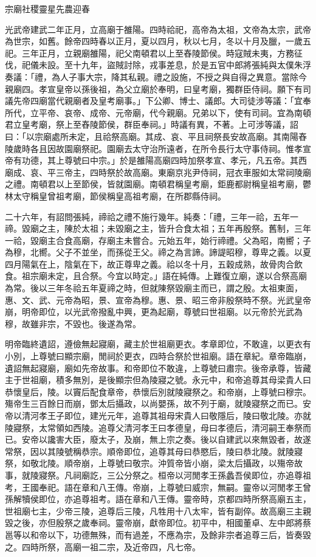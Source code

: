 
\begin{pinyinscope}
宗廟社稷靈星先農迎春

光武帝建武二年正月，立高廟于雒陽。四時祫祀，高帝為太祖，文帝為太宗，武帝為世宗，如舊。餘帝四時春以正月，夏以四月，秋以七月，冬以十月及臘，一歲五祀。三年正月，立親廟雒陽，祀父南頓君以上至舂陵節侯。時寇賊未夷，方務征伐，祀儀未設。至十九年，盜賊討除，戎事差息，於是五官中郎將張純與太僕朱浮奏議：「禮，為人子事大宗，降其私親。禮之設施，不授之與自得之異意。當除今親廟四。孝宣皇帝以孫後祖，為父立廟於奉明，曰皇考廟，獨群臣侍祠。願下有司議先帝四廟當代親廟者及皇考廟事。」下公卿、博士、議郎。大司徒涉等議：「宜奉所代，立平帝、哀帝、成帝、元帝廟，代今親廟。兄弟以下，使有司祠。宜為南頓君立皇考廟，祭上至舂陵節侯，群臣奉祠。」時議有異，不著。上可涉等議，詔曰：「以宗廟處所未定，且祫祭高廟。其成、哀、平且祠祭長安故高廟。其南陽舂陵歲時各且因故園廟祭祀。園廟去太守治所遠者，在所令長行太守事侍祠。惟孝宣帝有功德，其上尊號曰中宗。」於是雒陽高廟四時加祭孝宣、孝元，凡五帝。其西廟成、哀、平三帝主，四時祭於故高廟。東廟京兆尹侍祠，冠衣車服如太常祠陵廟之禮。南頓君以上至節侯，皆就園廟。南頓君稱皇考廟，鉅鹿都尉稱皇祖考廟，鬱林太守稱皇曾祖考廟，節侯稱皇高祖考廟，在所郡縣侍祠。

二十六年，有詔問張純，禘祫之禮不施行幾年。純奏：「禮，三年一祫，五年一禘。毀廟之主，陳於太祖；未毀廟之主，皆升合食太祖；五年再殷祭。舊制，三年一祫，毀廟主合食高廟，存廟主未嘗合。元始五年，始行禘禮。父為昭，南嚮；子為穆，北嚮。父子不並坐，而孫從王父。禘之為言諦。諦諟昭穆，尊卑之義。以夏四月陽氣在上，陰氣在下，故正尊卑之義。祫以冬十月，五穀成熟，故骨肉合飲食。祖宗廟未定，且合祭。今宜以時定。」語在純傳。上難復立廟，遂以合祭高廟為常。後以三年冬祫五年夏禘之時，但就陳祭毀廟主而已，謂之殷。太祖東面，惠、文、武、元帝為昭，景、宣帝為穆。惠、景、昭三帝非殷祭時不祭。光武皇帝崩，明帝即位，以光武帝撥亂中興，更為起廟，尊號曰世祖廟。以元帝於光武為穆，故雖非宗，不毀也。後遂為常。

明帝臨終遺詔，遵儉無起寢廟，藏主於世祖廟更衣。孝章即位，不敢違，以更衣有小別，上尊號曰顯宗廟，閒祠於更衣，四時合祭於世祖廟。語在章紀。章帝臨崩，遺詔無起寢廟，廟如先帝故事。和帝即位不敢違，上尊號曰肅宗。後帝承尊，皆藏主于世祖廟，積多無別，是後顯宗但為陵寢之號。永元中，和帝追尊其母梁貴人曰恭懷皇后，陵。以竇后配食章帝，恭懷后別就陵寢祭之。和帝崩，上尊號曰穆宗。殤帝生三百餘日而崩，鄧太后攝政，以尚嬰孫，故不列于廟，就陵寢祭之而已。安帝以清河孝王子即位，建光元年，追尊其祖母宋貴人曰敬隱后，陵曰敬北陵。亦就陵寢祭，太常領如西陵。追尊父清河孝王曰孝德皇，母曰孝德后，清河嗣王奉祭而已。安帝以讒害大臣，廢太子，及崩，無上宗之奏。後以自建武以來無毀者，故遂常祭，因以其陵號稱恭宗。順帝即位，追尊其母曰恭愍后，陵曰恭北陵。就陵寢祭，如敬北陵。順帝崩，上尊號曰敬宗。沖質帝皆小崩，梁太后攝政，以殤帝故事，就陵寢祭。凡祠廟訖，三公分祭之。桓帝以河閒孝王孫蠡吾侯即位，亦追尊祖考，王國奉祀。語在章和八王傳。帝崩，上尊號曰威宗，無嗣。靈帝以河閒孝王曾孫解犢侯即位，亦追尊祖考。語在章和八王傳。靈帝時，京都四時所祭高廟五主，世祖廟七主，少帝三陵，追尊后三陵，凡牲用十八太牢，皆有副倅。故高廟三主親毀之後，亦但殷祭之歲奉祠。靈帝崩，獻帝即位。初平中，相國董卓、左中郎將蔡邕等以和帝以下，功德無殊，而有過差，不應為宗，及餘非宗者追尊三后，皆奏毀之。四時所祭，高廟一祖二宗，及近帝四，凡七帝。


\end{pinyinscope}
